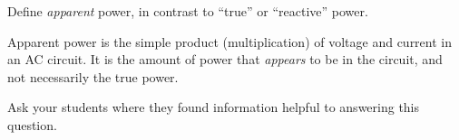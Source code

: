 

Define {\it apparent} power, in contrast to ``true'' or ``reactive'' power.







Apparent power is the simple product (multiplication) of voltage and current in an AC circuit.  It is the amount of power that {\it appears} to be in the circuit, and not necessarily the true power.







Ask your students where they found information helpful to answering this question.




